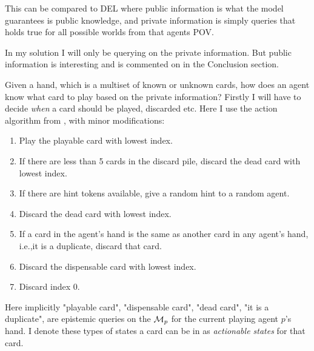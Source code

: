 This can be compared to DEL where public information is what the model guarantees is public knowledge, and private information is simply queries that holds true for all possible worlds from that agents POV.

In my solution I will only be querying on the private information. But public information is interesting and is commented on in the Conclusion section.

Given a hand, which is a multiset of known or unknown cards, how does an agent know what card to play based on the private information?
Firstly I will have to decide \emph{when} a card should be played, discarded etc. Here I use the action algorithm from \cite{CoxEtAl2015}, with minor modifications:
\begin{enumerate}
	\item Play the playable card with lowest index.
	\item If there are less than 5 cards in the discard pile, discard the dead card with lowest index.
	\item If there are hint tokens available, give a random hint to a random agent.
	\item Discard the dead card with lowest index.
	\item If a card in the agent’s hand is the same as another card in any agent’s hand, i.e.,it is a duplicate, discard that card.
	\item Discard the dispensable card with lowest index.
	\item Discard index 0.
\end{enumerate}

Here implicitly "playable card", "dispensable card", "dead card", "it is a duplicate", are epistemic queries on the $\mathcal{M}_p$ for the current playing agent $p$'s hand. I denote these types of states a card can be in as \emph{actionable states} for that card.

